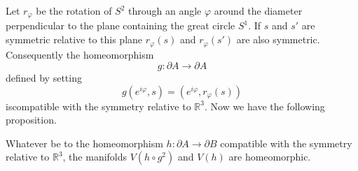  Let $r_{\varphi}$ be the rotation of $S^2$ through an angle $\varphi$
 around the diameter perpendicular to the plane containing the great
 circle $S^1$. If $s$ and $s'$ are symmetric relative to this plane
 $r_\varphi (s)$ and $r_{\varphi} (s')$ are also
 symmetric. Consequently the homeomorphism   
$$
g: \partial A \to \partial A
$$
defined by setting 
$$
g(e^{i \varphi}, s)  = (e^{i \varphi }, r_{\varphi} (s))
$$
is\pageoriginale compatible with the symmetry relative to
$\mathbb{R}^{3}$. Now we have the following proposition.  

\setcounter{proposition}{0}
\begin{proposition}\label{prop1}%
Whatever be to the homeomorphism $h : \partial A \to \partial B$
  compatible with the symmetry relative to $\mathbb{R}^{3}$, the
  manifolds $V(h\circ g^2) $ and $V(h)$ are homeomorphic. 
\end{proposition}

